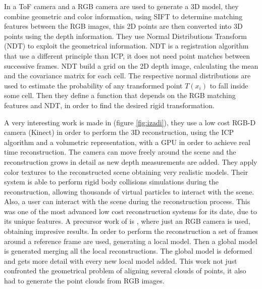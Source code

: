 In \cite{huhle} a ToF camera and a RGB camera are used to generate a 3D model, they combine geometric and color information, 
using SIFT to determine matching features between the RGB images, 
this 2D points are then converted into 3D points using the depth information. They use  Normal Distributions Transform (NDT) \cite{biber03} to exploit the geometrical 
information. NDT is a registration algorithm that use a different principle than ICP, it does not need point matches 
between successive frames. NDT build a grid on the 2D depth image, calculating the mean and the covariance matrix for each 
 cell. The respective normal distributions are used to estimate the probability of any transformed point $T(x_i)$ to fall 
inside some cell. Then they define a function that depends on the RGB matching features and NDT, in order to find the desired 
rigid transformation.

 
A very interesting work is made in \cite{izadi}(figure \ref{fig:izadi}), they use a low cost RGB-D camera (Kinect) in order to perform
the 3D reconstruction, using the ICP algorithm  and a volumetric representation, with a GPU in order to 
achieve real time reconstruction. The camera can move freely around the scene and the reconstruction grows in detail 
as new depth measurements are added. They apply color textures to the reconstructed scene obtaining very 
realistic models. Their system is able to perform rigid body collisions 
simulations during the reconstruction, allowing thousands of virtual particles to interact with the scene. Also, a 
user can interact with the scene during the reconstruction process. This was one of the most advanced low cost 
reconstruction systems for its date, due to its unique features. A precursor work of \cite{izadi} is \cite{Newcombe10livedense}, where 
 just an RGB camera is used, obtaining impresive results. In order to perform the reconstruction a set of frames around 
a reference frame are used, generating a local model. Then a global model is generated merging all the local reconstructions.
The global model is deformed and gets more detail with every new local model added. This work not just confronted 
the geometrical problem of aligning several clouds of points, it also had to generate the point clouds from RGB images.

